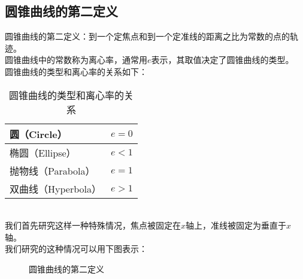 \documentclass[UTF8]{ctexart}
\begin{document}
\subsection{圆锥曲线的第二定义}
    \setcounter{equation}{0}
    圆锥曲线的第二定义：到一个定焦点和到一个定准线的距离之比为常数的点的轨迹。\\[3mm]
    圆锥曲线中的常数称为离心率，通常用$e$表示，其取值决定了圆锥曲线的类型。\\[3mm]
    圆锥曲线的类型和离心率的关系如下：\vspace{5pt}
    \begin{table}[h]
        \begin{center}
            \begin{tabular}{p{130pt}|p{80pt}}
                \hline
                圆（Circle）&$e=0$\\ \hline
                椭圆（Ellipse）&$e<1$\\ \hline
                抛物线（Parabola）&$e=1$\\ \hline
                双曲线（Hyperbola）&$e>1$\\ \hline
            \end{tabular}
            \caption{圆锥曲线的类型和离心率的关系}
        \end{center}
    \end{table}\\
    我们首先研究这样一种特殊情况，焦点被固定在$x$轴上，准线被固定为垂直于$x$轴。\\[3mm]
    我们研究的这种情况可以用下图表示：\vspace{5pt}
    \begin{figure}[h]
        \begin{center}
            \caption{圆锥曲线的第二定义}
        \end{center}
    \end{figure}\\
\end{document}
